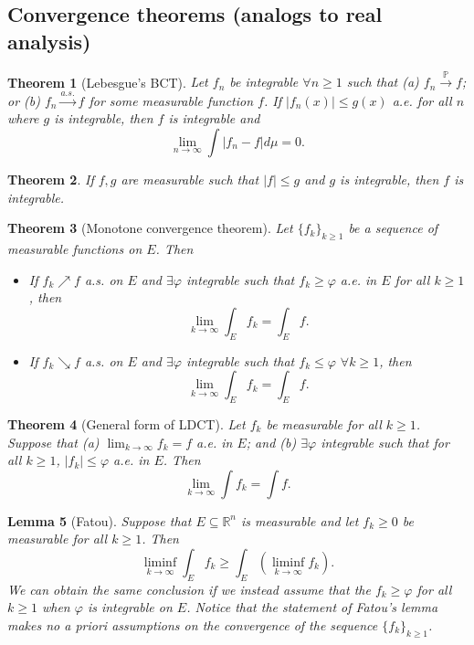 \documentclass[12pt,reqno]{article}
\theoremstyle{plain}
\newtheorem{theorem}{Theorem}[section]
\newtheorem{lemma}[theorem]{Lemma}
\theoremstyle{definition}
\begin{document}
\subsection{Convergence theorems (analogs to real analysis)} 

\begin{theorem}[Lebesgue's BCT] 
Let $f_n$ be integrable $\forall n \geq 1$ such that (a) $f_n \xrightarrow{\mathbb{P}} f$; 
or (b) $f_n \xrightarrow{a.s.} f$ for some measurable function $f$. 
If $|f_n(x)| \leq g(x)$ a.e. for all $n$ 
where $g$ is integrable, then $f$ is integrable and 
\[
\lim_{n \rightarrow \infty} \int |f_n-f|d\mu = 0. 
\]
\end{theorem} 

\begin{theorem}
If $f,g$ are measurable such that $|f| \leq g$ and $g$ is integrable, then $f$ is 
integrable. 
\end{theorem} 

\begin{theorem}[Monotone convergence theorem] 
Let $\{f_k\}_{k \geq 1}$ be a sequence of measurable functions on $E$. Then 
\begin{itemize} 
\item[(1)] If $f_k \nearrow f$ a.s. on $E$ and $\exists \varphi$ integrable such that 
     $f_k \geq \varphi$ a.e. in $E$ for all $k \geq 1$, then 
     \[
     \lim_{k \rightarrow \infty} \int_E f_k = \int_E f.
     \]
\item[(2)] If $f_k \searrow f$ a.s. on $E$ and $\exists \varphi$ integrable such that 
     $f_k \leq \varphi$ $\forall k \geq 1$, then 
     \[
     \lim_{k \rightarrow \infty} \int_E f_k = \int_E f.
     \]
\end{itemize} 
\end{theorem} 

\begin{theorem}[General form of LDCT] 
Let $f_k$ be measurable for all $k \geq 1$. Suppose that 
(a) $\lim_{k \rightarrow \infty} f_k = f$ a.e. in $E$; and (b) $\exists \varphi$ integrable 
such that for all $k \geq 1$, $|f_k| \leq \varphi$ a.e. in $E$. Then 
\[
\lim_{k \rightarrow \infty} \int f_k = \int f. 
\]
\end{theorem}

\begin{lemma}[Fatou]
Suppose that $E \subseteq \mathbb{R}^n$ is measurable and let $f_k \geq 0$ be measurable for all 
$k \geq 1$. Then 
\[
\liminf_{k \rightarrow \infty} \int_E f_k \geq \int_E \left(\liminf_{k \rightarrow \infty} f_k\right). 
\]
We can obtain the same conclusion if we instead assume that the $f_k \geq \varphi$ 
for all $k \geq 1$ when $\varphi$ is integrable on $E$. 
Notice that the statement of Fatou's lemma makes no a priori assumptions on the 
convergence of the sequence $\{f_k\}_{k \geq 1}$. 
\end{lemma}
\end{document}
